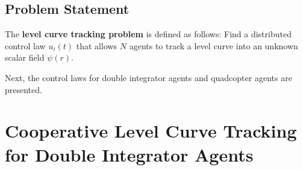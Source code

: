 %
%

\subsection{Problem Statement}

The \textbf{ level curve tracking problem} is defined as follows: Find a distributed control law $u_i(t)$ that allows $N$ agents to track a level curve into an unknown scalar field $\psi(r)$. %


Next, the control laws for double integrator agents and quadcopter agents are presented.


\section{Cooperative Level Curve Tracking for Double Integrator Agents}  \label{sec:lc_doubleint}

